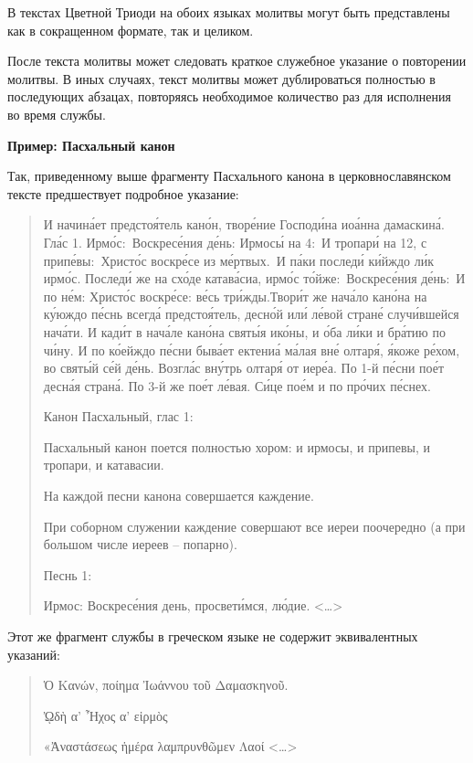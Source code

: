 \documentclass[
  letterpaper,
]{book}
\begin{document}
В текстах Цветной Триоди на обоих языках молитвы могут быть представлены
как в сокращенном формате, так и целиком.

После текста молитвы может следовать краткое служебное указание о
повторении молитвы. В иных случаях, текст молитвы может дублироваться
полностью в последующих абзацах, повторяясь необходимое количество раз
для исполнения во время службы.

\begin{tcolorbox}[enhanced jigsaw, rightrule=.15mm, breakable, colframe=quarto-callout-tip-color-frame, colback=white, leftrule=.75mm, left=2mm, arc=.35mm, opacityback=0, toprule=.15mm, bottomrule=.15mm]

\textbf{Пример: Пасхальный канон}\vspace{2mm}

Так, приведенному выше фрагменту Пасхального канона в церковнославянском
тексте предшествует подробное указание:

\begin{quote}
И начина́ет предстоя́тель кано́н, творе́ние Господи́на иоа́нна дамаскина́. Гла́с
1. Ирмо́с:~Воскресе́ния де́нь: Ирмосы́ на 4:~И тропари́ на 12, с
припе́вы:~Христо́с воскре́се из ме́ртвых.~И па́ки последи́ ки́йждо ли́к ирмо́с.
Последи́ же на схо́де катава́сиа, ирмо́с то́йже:~Воскресе́ния де́нь:~И по не́м:
Христо́с воскре́се: ве́сь три́жды.Твори́т же нача́ло кано́на на ку́юждо пе́снь
всегда́ предстоя́тель, десно́й или́ ле́вой стране́ случи́вшейся нача́ти. И кади́т
в нача́ле кано́на святы́я ико́ны, и о́ба ли́ки и бра́тию по чи́ну. И по ко́ейждо
пе́сни быва́ет ектениа́ ма́лая вне́ олтаря́, я́коже ре́хом, во святы́й се́й де́нь.
Возгла́с вну́трь олтаря́ от иере́а. По 1-й пе́сни пое́т десна́я страна́. По 3-й
же пое́т ле́вая. Си́це пое́м и по про́чих пе́снех.

Канон Пасхальный, глас 1:

Пасхальный канон поется полностью хором: и ирмосы, и припевы, и тропари,
и катавасии.

На каждой песни канона совершается каждение.

При соборном служении каждение совершают все иереи поочередно (а при
большом числе иереев -- попарно).

Песнь 1:

Ирмос: Воскресе́ния день, просвети́мся, лю́дие.
\textless\ldots\textgreater{}
\end{quote}

Этот же фрагмент службы в греческом языке не содержит эквивалентных
указаний:

\begin{quote}
Ὁ Κανών, ποίημα Ἰωάννου τοῦ Δαμασκηνοῦ.

ᾨδὴ α' Ἦχος α' εἱρμὸς

«Ἀναστάσεως ἡμέρα λαμπρυνθῶμεν Λαοί \textless\ldots\textgreater{}
\end{quote}

\end{tcolorbox}
\end{document}
